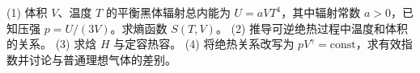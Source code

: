 (1) 体积 \(V\)、温度 \(T\) 的平衡黑体辐射总内能为 \(U=aVT^4\)，其中辐射常数 \(a>0\)，已知压强 \(p=U/(3V)\)。求熵函数 \(S(T,V)\)。
(2) 推导可逆绝热过程中温度和体积的关系。
(3) 求焓 \(H\) 与定容热容。
(4) 将绝热关系改写为 \(pV^\gamma=\mathrm{const}\)，求有效指数并讨论与普通理想气体的差别。
